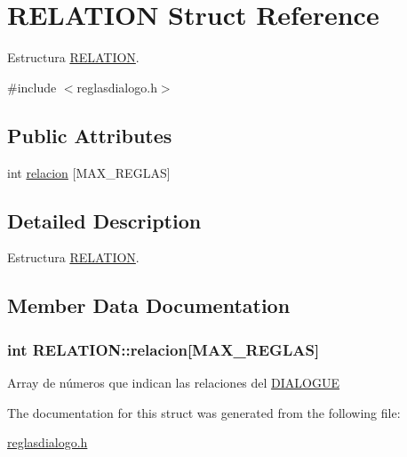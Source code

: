 \hypertarget{structRELATION}{
\section{RELATION Struct Reference}
\label{structRELATION}
}


Estructura \hyperlink{structRELATION}{RELATION}.  




{\ttfamily \#include $<$reglasdialogo.h$>$}

\subsection*{Public Attributes}
\begin{DoxyCompactItemize}
\item 
int \hyperlink{structRELATION_a3591c20b0bc0a2eb6aa98b7d771bdb94}{relacion} \mbox{[}MAX\_\-REGLAS\mbox{]}
\end{DoxyCompactItemize}


\subsection{Detailed Description}
Estructura \hyperlink{structRELATION}{RELATION}. 

\subsection{Member Data Documentation}
\hypertarget{structRELATION_a3591c20b0bc0a2eb6aa98b7d771bdb94}{
\subsubsection[{relacion}]{\setlength{\rightskip}{0pt plus 5cm}int {\bf RELATION::relacion}\mbox{[}MAX\_\-REGLAS\mbox{]}}}
\label{structRELATION_a3591c20b0bc0a2eb6aa98b7d771bdb94}
Array de números que indican las relaciones del \hyperlink{structDIALOGUE}{DIALOGUE} 

The documentation for this struct was generated from the following file:\begin{DoxyCompactItemize}
\item 
\hyperlink{reglasdialogo_8h}{reglasdialogo.h}\end{DoxyCompactItemize}
